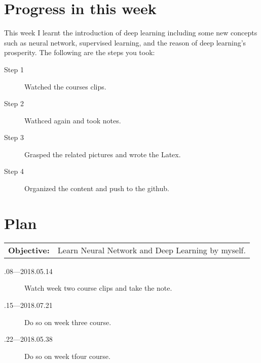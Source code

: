 \documentclass[a4paper]{article}
\begin{document}
\section{Progress in this week}
This week I learnt the introduction of deep learning including some new concepts such as neural network, supervised learning, and the reason of deep learning's prosperity. The following are the steps you took:
\begin{description}
\item [Step 1]
Watched the courses clips.
\item[Step 2]
Wathced again and took notes.
\item[Step 3]
Grasped the related pictures and wrote the Latex.
\item[Step 4]
Organized the content and push to the github.
\end{description}


\section{Plan}

\begin{tabular}{rl}
	\textbf{Objective:} & Learn Neural Network and Deep Learning by myself. \\
\end{tabular}

\begin{description}
    \item[.08---2018.05.14] Watch week two course clips and take the note.
    \item[.15---2018.07.21] Do so on week three course.
    \item[.22---2018.05.38] Do so on week tfour course.
\end{description}



\end{document}
